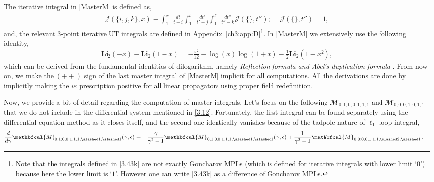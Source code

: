 \vspace{0.15cm}
The iterative integral in \eqref{MasterM} is defined as,
\begin{align}
    \boldsymbol{\mathscr{J}}(\{i,j,k\},x)\equiv \int_{1^-}^x \frac{dt}{t-i}\int_{1^-}^{t}\frac{dt'}{t'-j}\int_{1^-}^{t'}\frac{dt''}{t''-k} \boldsymbol{\mathscr{J}}(\{\},t'');~~~~~~\boldsymbol{\mathscr{J}}(\{\},t'')=1,\label{3.43k}
\end{align}
and, the relevant 3-point iterative UT integrals are defined in Appendix~\eqref{ch3:app:D}\footnote{Note that the integrals defined in \eqref{3.43k} are not exactly Goncharov MPLs (which is defined for iterative integrals with lower limit `$0$') because here the lower limit is `$1$'. However one can write \eqref{3.43k} as a difference of Goncharov MPLs.}. 
In \eqref{MasterM} we extensively use the following identity,
\begin{align}
    \textbf{Li}_2(-x)-\textbf{Li}_2(1-x)=-\frac{\pi^2}{12}-\log(x)\log(1+x)-\frac{1}{2}\textbf{Li}_2(1-x^2),
\end{align}
which can be derived from the fundamental identities of dilogarithm, namely \textit{Reflection formula and Abel's duplication formula}  \cite{goncha}. From now on, we make the $(++)$ sign of the last master integral of \eqref{MasterM} implicit for all computations. All the derivations are done by implicitly making the $i\varepsilon$ prescription positive for all linear propagators using proper field redefinition.\par
Now, we provide a bit of detail regarding the computation of master integrals. Let's focus on the following $\mathbfcal{M}_{0,1;0,0,1,1,1}$ and $\mathbfcal{M}_{0,0;0,1,0,1,1}$ that we do not include in the differential system mentioned in \eqref{3.12}. Fortunately, the first integral can be found separately using the differential equation method as it closes itself, and the second one identically vanishes because of the tadpole nature of $\ell_{1}$ loop integral,
\begin{align}
    \begin{split}
     &   \frac{d}{d\gamma}\mathbfcal{M}_{0, 1; 0, 0, 1, 1, 1, \slashed 1, \slashed 1}(\gamma,\epsilon)=-\frac{\gamma}{\gamma^2-1}\mathbfcal{M}_{0, 1; 0, 0, 1, 1, 1, \slashed 1, \slashed 1}(\gamma,\epsilon)+\frac{1}{\gamma^2-1}{\mathbfcal{M}_{0, 0; 0, 0, 1, 1, 1, \slashed 2, \slashed 1}}\,.
     \label{3.29}
    \end{split}
\end{align}
